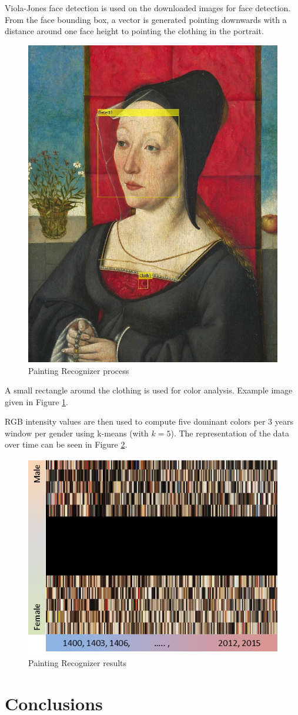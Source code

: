 \documentclass[runningheads]{llncs}
\begin{document}
Viola-Jones\cite{viola} face detection is used on the downloaded images for face detection. From the face bounding box, a vector is generated pointing downwards with a distance around one face height to pointing the clothing in the portrait.

\begin{figure}
	\centering
	\includegraphics[width=.5\textwidth]{PaintingRecognizer-matlab_results}
	\caption{Painting Recognizer process}
	\label{pr-process}	
\end{figure}

A small rectangle around the clothing is used for color analysis. Example image given in Figure \ref{pr-process}. 

RGB intensity values are then used to compute five dominant colors per 3 years window per gender using k-means (with $k=5$). The representation of the data over time can be seen in Figure \ref{pr-result}.

\begin{figure}
	\centering
	\includegraphics[width=.5\textwidth]{PaintingRecognizer-results}
	\caption{Painting Recognizer results}
	\label{pr-result}	
\end{figure}


\section{Conclusions}

\clearpage



\end{document}
